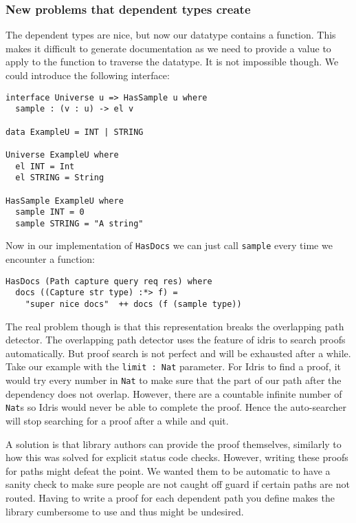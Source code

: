 \documentclass[12pt,a4paper]{article}
\begin{document}
\subsubsection{New problems that dependent types create}
The dependent types are nice, but now our datatype contains a function.
This makes it difficult to generate documentation as we need to provide a value
to apply to the function to traverse the datatype. It is not impossible though. We could introduce the following interface:
\begin{verbatim}
interface Universe u => HasSample u where
  sample : (v : u) -> el v

data ExampleU = INT | STRING

Universe ExampleU where
  el INT = Int
  el STRING = String

HasSample ExampleU where
  sample INT = 0
  sample STRING = "A string"
\end{verbatim}
Now in our implementation of \texttt{HasDocs} we can just call \texttt{sample}
every time we encounter a function:
\begin{verbatim}
HasDocs (Path capture query req res) where
  docs ((Capture str type) :*> f) =
    "super nice docs"  ++ docs (f (sample type))
\end{verbatim}

The real problem though is that this representation breaks the overlapping path detector.
The overlapping path detector uses the feature of idris to search proofs automatically. But
proof search is not perfect and will be exhausted after a while. Take our example with the
\texttt{limit : Nat} parameter. For Idris to find a proof, it would try every number
in \texttt{Nat} to  make sure that the part of our path after the dependency does
not overlap. However, there are a countable infinite number of \texttt{Nat}s so
Idris would never be able to complete the proof. Hence the auto-searcher will stop searching
for a proof after a while and quit.

A solution is that library authors can provide the proof themselves, similarly to how this
was solved for explicit status code checks.  However, writing these proofs for paths might
defeat the point. We wanted them to be automatic to have a sanity check to make sure
people are not caught off guard if certain paths are not routed. Having to write a proof
for each dependent path you define makes the library cumbersome to use and thus might
be undesired.
\end{document}
